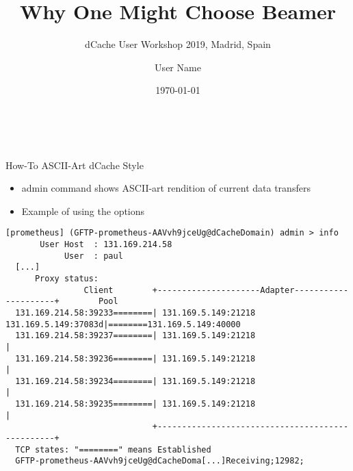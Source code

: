 \documentclass[english, presentation, aspectratio=169, 14pt]{beamer} %
\title{Why One Might Choose Beamer}
\subtitle{dCache User Workshop 2019, Madrid, Spain}
\author{User Name}
\institute{dCache Team}
\date{\today}
\begin{document}
	
	{ %
		
	\begin{frame}
		\centering
		\vspace{15mm}
		
		\MainTitle{\inserttitle}\\
		\vspace{3mm}
		\MainSubTitle{\insertauthor}{\insertinstitute}{\insertsubtitle}
		
		\vfill
		\flushright
		\LogoGroup
	\end{frame}
	}

	\begin{frame}[fragile]{How-To ASCII-Art dCache Style}
		\begin{itemize}
			\item {} admin command shows ASCII-art rendition of current data transfers
			\item Example of  using the options \CodeLine{-no-g2 -p 5}
		\end{itemize}\color{darkgray}
\begin{lstlisting}[basicstyle=\tiny]
  [prometheus] (GFTP-prometheus-AAVvh9jceUg@dCacheDomain) admin > info
       User Host  : 131.169.214.58
            User  : paul
  [...]
      Proxy status:
                Client        +---------------------Adapter---------------------+        Pool
  131.169.214.58:39233========| 131.169.5.149:21218         131.169.5.149:37083d|========131.169.5.149:40000
  131.169.214.58:39237========| 131.169.5.149:21218                             |
  131.169.214.58:39236========| 131.169.5.149:21218                             |
  131.169.214.58:39234========| 131.169.5.149:21218                             |
  131.169.214.58:39235========| 131.169.5.149:21218                             |
                              +-------------------------------------------------+
  TCP states: "========" means Established
  GFTP-prometheus-AAVvh9jceUg@dCacheDoma[...]Receiving;12982;
\end{lstlisting}\color{dcacheblue}
	\end{frame}

	
\end{document}
